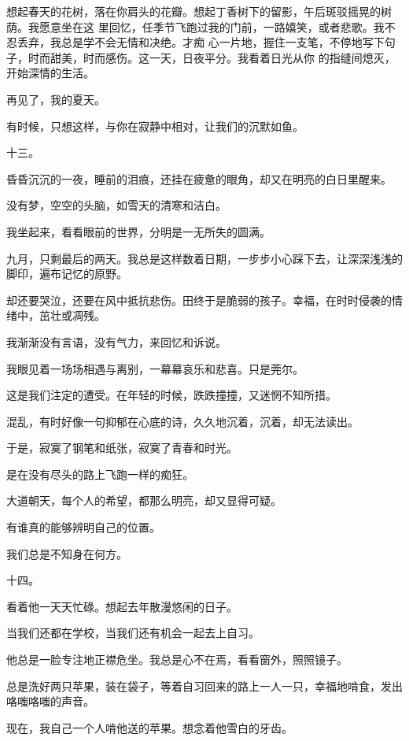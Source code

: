 \documentclass[12pt,a4paper]{article}
\def\blankrev{\vspace{1ex}}									%
\newcommand{\subpart}[1]{
	\begingroup \par
	\vspace{1ex} \centering #1
	\par \endgroup
}
\begin{document}
		想起春天的花树，落在你肩头的花瓣。想起丁香树下的留影，午后斑驳摇晃的树荫。我愿意坐在这
	里回忆，任季节飞跑过我的门前，一路嬉笑，或者悲歌。我不忍丢弃，我总是学不会无情和决绝。才痴
	心一片地，握住一支笔，不停地写下句子，时而甜美，时而感伤。这一天，日夜平分。我看着日光从你
	的指缝间熄灭，开始深情的生活。

		再见了，我的夏天。

	\endwriting



		有时候，只想这样，与你在寂静中相对，让我们的沉默如鱼。

		\subpart{十三。}

		昏昏沉沉的一夜，睡前的泪痕，还挂在疲惫的眼角，却又在明亮的白日里醒来。\par
		没有梦，空空的头脑，如雪天的清寒和洁白。\par
		我坐起来，看看眼前的世界，分明是一无所失的圆满。\par
		九月，只剩最后的两天。我总是这样数着日期，一步步小心踩下去，让深深浅浅的脚印，遍布记忆的原野。\par
		却还要哭泣，还要在风中抵抗悲伤。田终于是脆弱的孩子。幸福，在时时侵袭的情绪中，茁壮或凋残。\par
		我渐渐没有言语，没有气力，来回忆和诉说。\par
		我眼见着一场场相遇与离别，一幕幕哀乐和悲喜。只是莞尔。

		\blankrev
		这是我们注定的遭受。在年轻的时候，跌跌撞撞，又迷惘不知所措。\par
		混乱，有时好像一句抑郁在心底的诗，久久地沉着，沉着，却无法读出。\par
		于是，寂寞了钢笔和纸张，寂寞了青春和时光。\par
		是在没有尽头的路上飞跑一样的痴狂。\par
		大道朝天，每个人的希望，都那么明亮，却又显得可疑。\par
		有谁真的能够辨明自己的位置。\par
		我们总是不知身在何方。


		\subpart{十四。}

		看着他一天天忙碌。想起去年散漫悠闲的日子。\par
		当我们还都在学校，当我们还有机会一起去上自习。\par
		他总是一脸专注地正襟危坐。我总是心不在焉，看看窗外，照照镜子。\par
		总是洗好两只苹果，装在袋子，等着自习回来的路上一人一只，幸福地啃食，发出咯嗤咯嗤的声音。\par
		现在，我自己一个人啃他送的苹果。想念着他雪白的牙齿。
\end{document}
